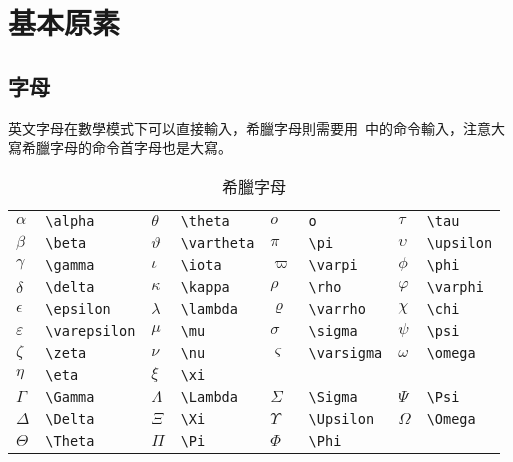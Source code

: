 \section{基本原素}
\subsection{字母}

英文字母在數學模式下可以直接輸入，希臘字母則需要用~中的命令輸入，注意大寫希臘字母的命令首字母也是大寫。

\begin{table}[htbp]
\caption{希臘字母}
\label{tab:greek}
\centering
\begin{tabular}{llllllll}
    \toprule
    $\alpha$      & \verb|\alpha|      & $\theta$    & \verb|\theta|    & 
        $o$         & \verb|o|        & $\tau$     & \verb|\tau| \\
    $\beta$       & \verb|\beta|       & $\vartheta$ & \verb|\vartheta| & 
        $\pi$       & \verb|\pi|      & $\upsilon$ & \verb|\upsilon| \\
    $\gamma$      & \verb|\gamma|      & $\iota$     & \verb|\iota|     & 
        $\varpi$    & \verb|\varpi|   & $\phi$     & \verb|\phi| \\
    $\delta$      & \verb|\delta|      & $\kappa$    & \verb|\kappa|    & 
        $\rho$      & \verb|\rho|     & $\varphi$  & \verb|\varphi| \\
    $\epsilon$    & \verb|\epsilon|    & $\lambda$   & \verb|\lambda|   & 
        $\varrho$   & \verb|\varrho|  & $\chi$     & \verb|\chi| \\
    $\varepsilon$ & \verb|\varepsilon| & $\mu$       & \verb|\mu|       & 
        $\sigma$    & \verb|\sigma|   & $\psi$     & \verb|\psi| \\
    $\zeta$       & \verb|\zeta|       & $\nu$       & \verb|\nu|       & 
        $\varsigma$ & \verb|\varsigma|   & $\omega$   & \verb|\omega| \\
    $\eta$        & \verb|\eta|        & $\xi$       & \verb|\xi|       & 
        &                 &            & \\
    $\Gamma$      & \verb|\Gamma|      & $\Lambda$   & \verb|\Lambda|   & 
        $\Sigma$    & \verb|\Sigma|   & $\Psi$     & \verb|\Psi| \\
    $\Delta$      & \verb|\Delta|      & $\Xi$       & \verb|\Xi|       & 
        $\Upsilon$  & \verb|\Upsilon| & $\Omega$   & \verb|\Omega| \\
    $\Theta$      & \verb|\Theta|      & $\Pi$       & \verb|\Pi|       & 
        $\Phi$      & \verb|\Phi|     &            & \\
    \bottomrule
\end{tabular}
\end{table}

